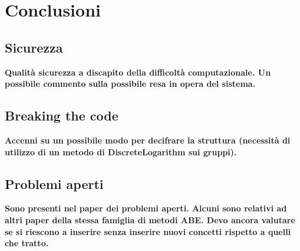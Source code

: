 \chapter{Conclusioni}
\section{Sicurezza}
\textbf{Qualità sicurezza a discapito della difficoltà computazionale. Un possibile commento sulla possibile resa in opera del sistema.}
\section{Breaking the code}
\textbf{Accenni su un possibile modo per decifrare la struttura (necessità di utilizzo di un metodo di DiscreteLogarithm sui gruppi).}
\section{Problemi aperti}
\textbf{Sono presenti nel paper dei problemi aperti. Alcuni sono relativi ad altri paper della stessa famiglia di metodi ABE. Devo ancora valutare se si riescono a inserire senza inserire nuovi concetti rispetto a quelli che tratto.}
